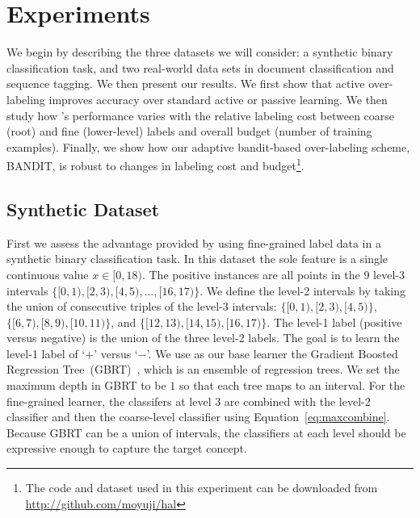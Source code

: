 \section{Experiments}
\label{sec:results}

We begin by describing the three datasets we will consider: a synthetic binary classification task,
and two real-world data sets in document classification and sequence tagging.
We then present our results.  We first show that active over-labeling
improves accuracy over standard active or passive learning. 
We then study how \sys 's 
performance varies with the relative labeling cost between
coarse (root) and fine (lower-level) labels and overall budget
(number of training examples).
Finally, we show how our adaptive bandit-based
over-labeling scheme, BANDIT, is robust
to changes in labeling cost and budget\footnote{The
code and dataset used in this experiment can be downloaded from
\url{http://github.com/moyuji/hal}}.

\subsection{Synthetic Dataset}
\label{sec:synth}

First we assess the advantage provided by using fine-grained label data in a synthetic binary
classification task. In this dataset the sole feature is a single continuous value
$x\in[0,18)$. The positive instances are all points in the $9$ level-3 intervals
$\{[0,1), [2,3), [4,5),\ldots,[16,17) \}$. We define the level-2 intervals by taking 
the union of consecutive triples of the level-3 intervals:
$\{[0,1), [2,3), [4,5) \}$, $\{[6,7), [8,9), [10,11) \}$, and
$\{[12,13), [14,15), [16,17) \}$. The level-1 label (positive versus negative) 
is the union of the three level-2 labels.
The goal is to learn the level-1 label of `$+$' versus `$-$'. 
We use as our base learner the Gradient Boosted Regression
Tree~(GBRT)~\cite{Friedman2001}, which is an ensemble of regression trees. 
We set the maximum depth in GBRT to be $1$ 
so that each tree maps to an interval. For the fine-grained learner,
the classifers at level 3 are combined with the level-2 classifier and then the
coarse-level classifier using Equation~\ref{eq:maxcombine}. Because GBRT can be
a union of intervals, the classifiers at each level should be expressive enough
to capture the target concept.



